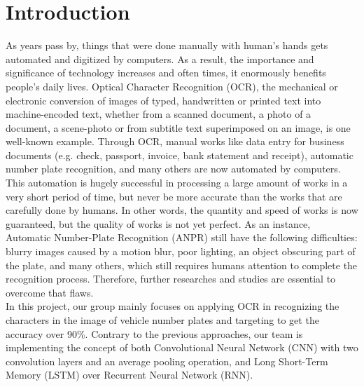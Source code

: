 \documentclass[conference]{IEEEtran}
\begin{document}
\section{Introduction}
As years pass by, things that were done manually with human’s hands gets automated and digitized by computers. As a result, the importance and significance of technology increases and often times, it enormously benefits people’s daily lives. Optical Character Recognition (OCR), \cite{b1} the mechanical or electronic conversion of images of typed, handwritten or printed text into machine-encoded text, whether from a scanned document, a photo of a document, a scene-photo or from subtitle text superimposed on an image, is one well-known example. Through OCR, manual works like data entry for business documents (e.g. check, passport, invoice, bank statement and receipt), automatic number plate recognition, and many others are now automated by computers. This automation is hugely successful in processing a large amount of works in a very short period of time, but never be more accurate than the works that are carefully done by humans. In other words, the quantity and speed of works is now guaranteed, but the quality of works is not yet perfect. As an instance, Automatic Number-Plate Recognition (ANPR) still have the following difficulties: \cite{b2} blurry images caused by a motion blur, poor lighting, an object obscuring part of the plate, and many others, which still requires humans attention to complete the recognition process. Therefore, further researches and studies are essential to overcome that flaws. 
\\In this project, our group mainly focuses on applying OCR in recognizing the characters in the image of vehicle number plates and targeting to get the accuracy over 90\%. Contrary to the previous approaches, our team is implementing the concept of both Convolutional Neural Network (CNN) with two convolution layers and an average pooling operation, and Long Short-Term Memory (LSTM) over Recurrent Neural Network (RNN).
\end{document}
